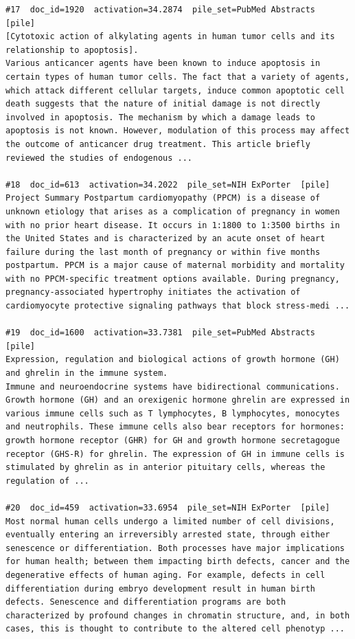 \begin{verbatim}
#17  doc_id=1920  activation=34.2874  pile_set=PubMed Abstracts  [pile]
[Cytotoxic action of alkylating agents in human tumor cells and its relationship to apoptosis].
Various anticancer agents have been known to induce apoptosis in certain types of human tumor cells. The fact that a variety of agents, which attack different cellular targets, induce common apoptotic cell death suggests that the nature of initial damage is not directly involved in apoptosis. The mechanism by which a damage leads to apoptosis is not known. However, modulation of this process may affect the outcome of anticancer drug treatment. This article briefly reviewed the studies of endogenous ...

#18  doc_id=613  activation=34.2022  pile_set=NIH ExPorter  [pile]
Project Summary Postpartum cardiomyopathy (PPCM) is a disease of unknown etiology that arises as a complication of pregnancy in women with no prior heart disease. It occurs in 1:1800 to 1:3500 births in the United States and is characterized by an acute onset of heart failure during the last month of pregnancy or within five months postpartum. PPCM is a major cause of maternal morbidity and mortality with no PPCM-specific treatment options available. During pregnancy, pregnancy-associated hypertrophy initiates the activation of cardiomyocyte protective signaling pathways that block stress-medi ...

#19  doc_id=1600  activation=33.7381  pile_set=PubMed Abstracts  [pile]
Expression, regulation and biological actions of growth hormone (GH) and ghrelin in the immune system.
Immune and neuroendocrine systems have bidirectional communications. Growth hormone (GH) and an orexigenic hormone ghrelin are expressed in various immune cells such as T lymphocytes, B lymphocytes, monocytes and neutrophils. These immune cells also bear receptors for hormones: growth hormone receptor (GHR) for GH and growth hormone secretagogue receptor (GHS-R) for ghrelin. The expression of GH in immune cells is stimulated by ghrelin as in anterior pituitary cells, whereas the regulation of ...

#20  doc_id=459  activation=33.6954  pile_set=NIH ExPorter  [pile]
Most normal human cells undergo a limited number of cell divisions, eventually entering an irreversibly arrested state, through either senescence or differentiation. Both processes have major implications for human health; between them impacting birth defects, cancer and the degenerative effects of human aging. For example, defects in cell differentiation during embryo development result in human birth defects. Senescence and differentiation programs are both characterized by profound changes in chromatin structure, and, in both cases, this is thought to contribute to the altered cell phenotyp ...

\end{verbatim}

